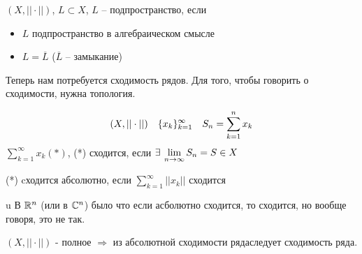 \documentclass[document]{subfiles}
\begin{document}
\begin{definition}[подпространство]
    $(X, || \cdot ||)$, $L \subset X$, $L$ -- подпространство, если
    \begin{itemize}
        \item $L$ подпространство в алгебраическом смысле
        \item $L = \overline{L}$ ($\overline{L}$ -- замыкание)
    \end{itemize}
\end{definition}

Теперь нам потребуется сходимость рядов. Для того, чтобы говорить о сходимости, нужна топология.

\begin{definition}[Cходимость]
    \[(X, || \cdot ||) \quad \{x_k \}^\infty_{k=1} \quad S_n = \sum^n_{k=1} x_k \]
    $\sum_{k=1}^\infty x_k (*)$,  
    (*) сходится, если $\exists \liml_{n \to \infty}{S_n} = S \in X$

    (*) cходится абсолютно, если $\sum^\infty_{k=1} ||x_k||$ сходится
\end{definition}u
В $\mathbb{R}^n$ (или в $\mathbb{C}^n$) было что если асболютно сходится, то сходится, но вообще говоря, это не так.

\begin{theorem}
    $(X, || \cdot||)$ - полное $\Rightarrow$ из абсолютной сходимости рядаследует сходимость ряда.
\end{theorem}
\end{document}
